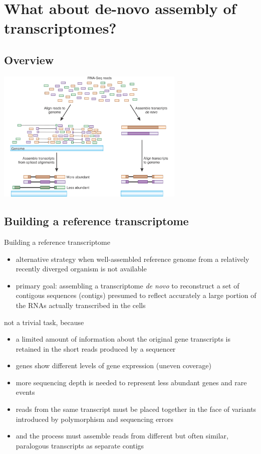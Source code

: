 \documentclass{beamer}\usepackage[]{graphicx}\usepackage[]{color}
\begin{document}
\section{What about de-novo assembly of transcriptomes?}
\subsection{Overview}
\begin{frame}
\centering
\includegraphics[width=9cm]{Images/workflows.pdf}
\end{frame}

\subsection{Building a reference transcriptome}
\begin{frame}
Building a reference transcriptome
\footnotesize
\begin{itemize}
 \item alternative strategy when well-assembled reference genome from a relatively recently diverged organism is not available
 \item primary goal: assembling a transcriptome \textit{de novo} to reconstruct a set of contigous sequences (contigs) presumed to reflect accurately a large portion of the RNAs actually transcribed in the cells
\end{itemize}
\vspace{5mm}
not a trivial task, because 
\begin{itemize}
\scriptsize
 \item a limited amount of information about the original gene transcripts is retained in the short reads produced by a sequencer
 \item genes show different levels of gene expression (uneven coverage)
 \item more sequencing depth is needed to represent less abundant genes and rare events
 \item reads from the same transcript must be placed together in the face of variants introduced by polymorphism and sequencing errors
 \item and the process must assemble reads from different but often similar, paralogous transcripts as separate contigs
\end{itemize}
\end{frame}
\end{document}

